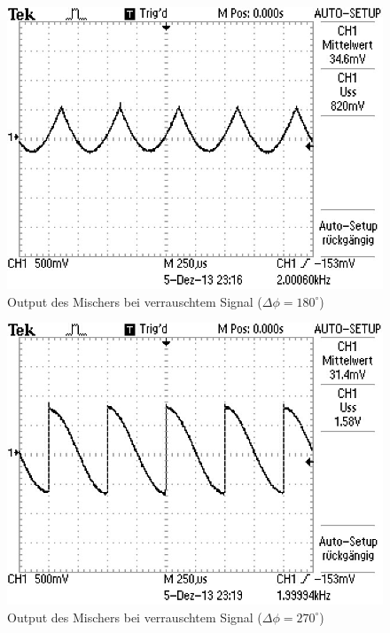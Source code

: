 \documentclass[11pt]{article}
\begin{document}
\begin{figure}[h]
\centering
\includegraphics[scale=0.85]{Bilder/5-noise-180.png}
\caption{Output des Mischers bei verrauschtem Signal ($\Delta\phi=180^\circ$) }
\label{Abb13}
\end{figure}

\begin{figure}[h]
\centering
\includegraphics[scale=0.85]{Bilder/5-noise-270.png}
\caption{Output des Mischers bei verrauschtem Signal ($\Delta\phi=270^\circ$)}
\label{Abb14}
\end{figure}
\end{document}
